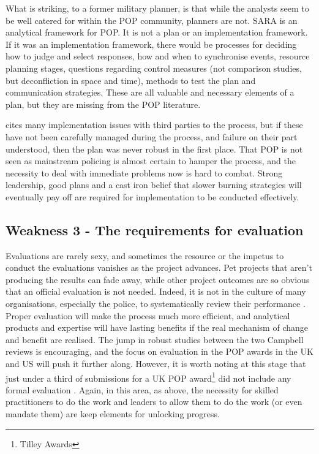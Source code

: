 What is striking, to a former military planner, is that while the analysts seem to be well catered for within the POP community, planners are not. SARA is an analytical framework for POP. It is not a plan or an implementation framework. If it was an implementation framework, there would be processes for deciding how to judge and select responses, how and when to synchronise events, resource planning stages, questions regarding control measures (not comparison studies, but deconfliction in space and time), methods to test the plan and communication strategies. These are all valuable and necessary elements of a plan, but they are missing from the POP literature. 

\parencite{hinkle2020problem} cites many implementation issues with third parties to the process, but if these have not been carefully managed during the process, and failure on their part understood, then the plan was never robust in the first place. That POP is not seen as mainstream policing is almost certain to hamper the process, and the necessity to deal with immediate problems now is hard to combat. Strong leadership, good plans and a cast iron belief that slower burning strategies will eventually pay off are required for implementation to be conducted effectively.

 
 \subsection{Weakness 3 - The requirements for evaluation}



Evaluations are rarely sexy, and sometimes the resource or the impetus to conduct the evaluations vanishes as the project advances. Pet projects that aren’t producing the results can fade away, while other project outcomes are so obvious that an official evaluation is not needed. Indeed, it is not in the culture of many organisations, especially the police, to systematically review their performance \parencite{goldstein1990}. Proper evaluation will make the process much more efficient, and analytical products and expertise will have lasting benefits if the real mechanism of change and benefit are realised. The jump in robust studies between the two Campbell reviews is encouraging, and the focus on evaluation in the POP awards in the UK and US will push it further along. However, it is worth noting at this stage that just under a third of submissions for a UK POP award\footnote{Tilley Awards} did not include any formal evaluation \parencite{POPUCL}. Again, in this area, as above, the necessity for skilled practitioners to do the work and leaders to allow them to do the work (or even mandate them) are keep elements for unlocking progress.  

